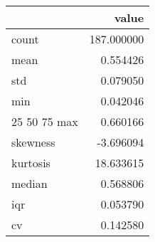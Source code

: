 \begin{tabular}{lr}
\toprule
 & value \\
\midrule
count & 187.000000 \\
mean & 0.554426 \\
std & 0.079050 \\
min & 0.042046 \\
25%
50%
75%
max & 0.660166 \\
skewness & -3.696094 \\
kurtosis & 18.633615 \\
median & 0.568806 \\
iqr & 0.053790 \\
cv & 0.142580 \\
\bottomrule
\end{tabular}
